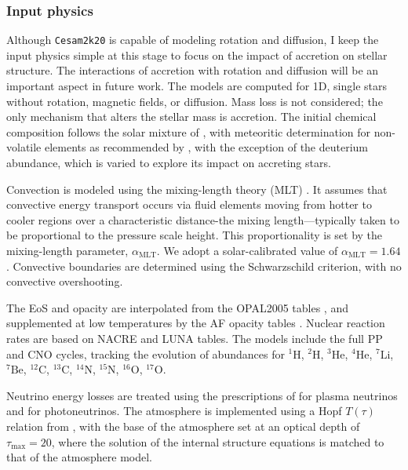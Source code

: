 \documentclass[12pt,a4paper]{article}
\newcommand{\mr}{\mathrm}
\begin{document}
\subsubsection{Input physics}
\label{sec:cesam2k20_input_physics}

Although \texttt{Cesam2k20} is capable of modeling rotation and diffusion, I keep the input physics simple at this stage to focus on the impact of accretion on stellar structure. The interactions of accretion with rotation and diffusion will be an important aspect in future work. The models are computed for 1D, single stars without rotation, magnetic fields, or diffusion. Mass loss is not considered; the only mechanism that alters the stellar mass is accretion. The initial chemical composition follows the solar mixture of \textcite{AsplundEtAl2009}, with meteoritic determination for non-volatile elements as recommended by \textcite{SerenelliEtAl2009}, with the exception of the deuterium abundance, which is varied to explore its impact on accreting stars.

Convection is modeled using the mixing-length theory (MLT) \parencite{CoxGiuli1968a}. It assumes that convective energy transport occurs via fluid elements moving from hotter to cooler regions over a characteristic distance-the mixing length—typically taken to be proportional to the pressure scale height. This proportionality is set by the mixing-length parameter, $\alpha_\mr{MLT}$. We adopt a solar-calibrated value of $\alpha_\mr{MLT} = 1.64$. Convective boundaries are determined using the Schwarzschild criterion, with no convective overshooting.

The EoS and opacity are interpolated from the OPAL2005 tables \parencite{RogersIglesias1992,IglesiasRogers1996,RogersNayfonov2002}, and supplemented at low temperatures by the AF opacity tables \parencite{FergusonEtAl2005}. Nuclear reaction rates are based on NACRE \parencite{AikawaEtAl2006} and LUNA \parencite{BrogginiEtAl2018} tables. The models include the full PP and CNO cycles, tracking the evolution of abundances for $^{1}\mr{H}$, $^{2}\mr{H}$, $^{3}\mr{He}$, $^{4}\mr{He}$, $^{7}\mr{Li}$, $^{7}\mr{Be}$, $^{12}\mr{C}$, $^{13}\mr{C}$, $^{14}\mr{N}$, $^{15}\mr{N}$, $^{16}\mr{O}$, $^{17}\mr{O}$.

Neutrino energy losses are treated using the prescriptions of \textcite{HaftEtAl1994} for plasma neutrinos and \textcite{Weigert1966} for photoneutrinos. The atmosphere is implemented using a Hopf $T(\tau)$ relation from \textcite{HubenyMihalas2015}, with the base of the atmosphere set at an optical depth of $\tau_{\max} = 20$, where the solution of the internal structure equations is matched to that of the atmosphere model.
\end{document}
